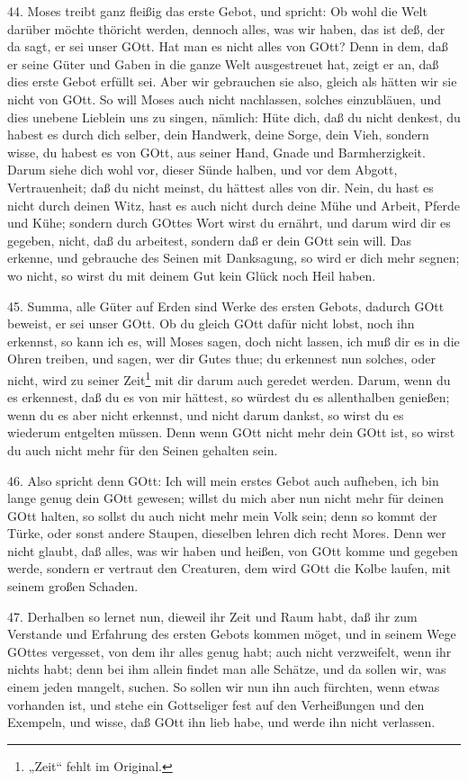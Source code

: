 44. Moses treibt ganz fleißig das erste Gebot, und spricht: Ob wohl die Welt darüber möchte thöricht werden, dennoch alles, was wir haben, das ist deß, der da sagt, er sei unser GOtt. Hat man es nicht alles von GOtt? Denn in dem, daß er seine Güter und Gaben in die ganze Welt ausgestreuet hat, zeigt er an, daß dies erste Gebot erfüllt sei. Aber wir gebrauchen sie also, gleich als hätten wir sie nicht von GOtt. So will Moses auch nicht nachlassen, solches einzubläuen, und dies unebene Lieblein uns zu singen, nämlich: Hüte dich, daß du nicht denkest, du habest es durch dich selber, dein Handwerk, deine Sorge, dein Vieh, sondern wisse, du habest es von GOtt, aus seiner Hand, Gnade und Barmherzigkeit. Darum siehe dich wohl vor, dieser Sünde halben, und vor dem Abgott, Vertrauenheit; daß du nicht meinst, du hättest alles von dir. Nein, du hast es nicht durch deinen Witz, hast es auch nicht durch deine Mühe und Arbeit, Pferde und Kühe; sondern durch GOttes Wort wirst du ernährt, und darum wird dir es gegeben, nicht, daß du arbeitest, sondern daß er dein GOtt sein will. Das erkenne, und gebrauche des Seinen mit Danksagung, so wird er dich mehr segnen; wo nicht, so wirst du mit deinem Gut kein Glück noch Heil haben.

45. Summa, alle Güter auf Erden sind Werke des ersten Gebots, dadurch GOtt beweist, er sei unser GOtt. Ob du gleich GOtt dafür nicht lobst, noch ihn erkennst, so kann ich es, will Moses sagen, doch nicht lassen, ich muß dir es in die Ohren treiben, und sagen, wer dir Gutes thue; du erkennest nun solches, oder nicht, wird zu seiner Zeit\footnote{„Zeit“ fehlt im Original.} mit dir darum auch geredet werden. Darum, wenn du es erkennest, daß du es von mir hättest, so würdest du es allenthalben genießen; wenn du es aber nicht erkennst, und nicht darum dankst, so wirst du es wiederum entgelten müssen. Denn wenn GOtt nicht mehr dein GOtt ist, so wirst du auch nicht mehr für den Seinen gehalten sein.

46. Also spricht denn GOtt: Ich will mein erstes Gebot auch aufheben, ich bin lange genug dein GOtt gewesen; willst du mich aber nun nicht mehr für deinen GOtt halten, so sollst du auch nicht mehr mein Volk sein; denn so kommt der Türke, oder sonst andere Staupen, dieselben lehren dich recht Mores. Denn wer nicht glaubt, daß alles, was wir haben und heißen, von GOtt komme und gegeben werde, sondern er vertraut den Creaturen, dem wird GOtt die Kolbe laufen, mit seinem großen Schaden.

47. Derhalben so lernet nun, dieweil ihr Zeit und Raum habt, daß ihr zum Verstande und Erfahrung des ersten Gebots kommen möget, und in seinem Wege GOttes vergesset, von dem ihr alles genug habt; auch nicht verzweifelt, wenn ihr nichts habt; denn bei ihm allein findet man alle Schätze, und da sollen wir, was einem jeden mangelt, suchen. So sollen wir nun ihn auch fürchten, wenn etwas vorhanden ist, und stehe ein Gottseliger fest auf den Verheißungen und den Exempeln, und wisse, daß GOtt ihn lieb habe, und werde ihn nicht verlassen.

